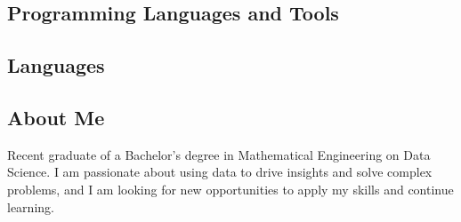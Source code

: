 \vspace*{-1em}
\begin{tcolorbox}
    \vspace*{-0.5em}
    \begin{minipage}[t]{0.3\textwidth} %
        \begin{tcolorbox}[height=0.8\textheight, grow to left by=0.6cm,colback=backdrop,colframe=backdrop,arc=0mm]

            \subsection*{Programming Languages and Tools}

            \subsection*{Languages}
        \end{tcolorbox}
    \end{minipage}
    \begin{minipage}[t]{0.7\textwidth} %
        \begin{tcolorbox}[grow to right by=0.75cm,height=0.8\textheight,colframe=white,colback=white]

            \section*{About Me}
            Recent graduate of a Bachelor's degree in Mathematical Engineering on 
            Data Science.  I am passionate about using data to drive insights and 
            solve complex problems, and I am looking for new opportunities to apply
            my skills and continue learning. 


\end{tcolorbox}
\end{minipage}
\end{tcolorbox}
